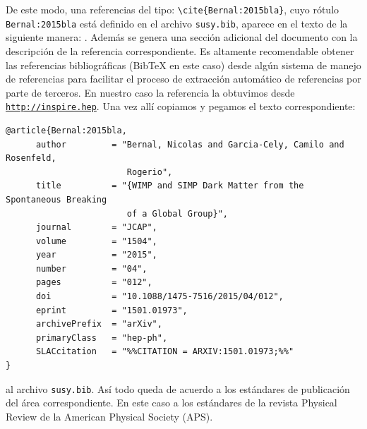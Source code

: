 \documentclass{article}
\begin{document}
De este modo, una referencias del tipo: \verb|\cite{Bernal:2015bla}|, cuyo rótulo \verb|Bernal:2015bla| está definido en el archivo \verb|susy.bib|, aparece en el texto de la siguiente manera: \cite{Bernal:2015bla}. Además se genera una sección adicional del documento con la descripción de la referencia correspondiente. Es altamente recomendable obtener las referencias bibliográficas (BibTeX en este caso) desde algún sistema de manejo de referencias para facilitar el proceso de extracción automático de referencias por parte de terceros. En nuestro caso la referencia la obtuvimos desde \href{http://inspirehep.net/record/1338091/export/hx}{\texttt{http://inspire.hep}}. Una vez allí copiamos y pegamos el texto correspondiente:
\begin{footnotesize}
\begin{lstlisting}
@article{Bernal:2015bla,
      author         = "Bernal, Nicolas and Garcia-Cely, Camilo and Rosenfeld,
                        Rogerio",
      title          = "{WIMP and SIMP Dark Matter from the Spontaneous Breaking
                        of a Global Group}",
      journal        = "JCAP",
      volume         = "1504",
      year           = "2015",
      number         = "04",
      pages          = "012",
      doi            = "10.1088/1475-7516/2015/04/012",
      eprint         = "1501.01973",
      archivePrefix  = "arXiv",
      primaryClass   = "hep-ph",
      SLACcitation   = "%%CITATION = ARXIV:1501.01973;%%"
}
\end{lstlisting}
\end{footnotesize}
al archivo  \verb|susy.bib|. Así todo queda de acuerdo a los estándares de publicación del área correspondiente. En este caso a los estándares de la revista  Physical Review de la American Physical Society  (APS).



\end{document}

